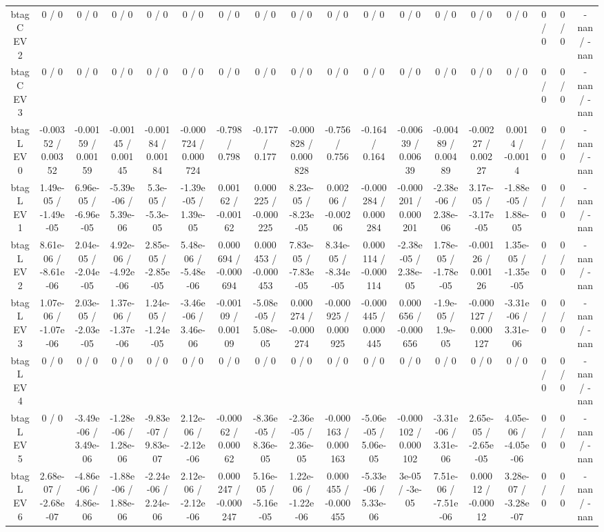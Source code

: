 \documentclass[10pt]{article}
\begin{document}
\begin{table}[htbp]
\begin{center}
\begin{tabular}{|c|c|c|c|c|c|c|c|c|c|c|c|c|c|c|c|c|c|}
  btag C EV 2 & 0 / 0 & 0 / 0 & 0 / 0 & 0 / 0 & 0 / 0 & 0 / 0 & 0 / 0 & 0 / 0 & 0 / 0 & 0 / 0 & 0 / 0 & 0 / 0 & 0 / 0 & 0 / 0 & 0 / 0 & 0 / 0 & -nan / -nan \\ 
  btag C EV 3 & 0 / 0 & 0 / 0 & 0 / 0 & 0 / 0 & 0 / 0 & 0 / 0 & 0 / 0 & 0 / 0 & 0 / 0 & 0 / 0 & 0 / 0 & 0 / 0 & 0 / 0 & 0 / 0 & 0 / 0 & 0 / 0 & -nan / -nan \\ 
  btag L EV 0 & -0.00352 / 0.00352 & -0.00159 / 0.00159 & -0.00145 / 0.00145 & -0.00184 / 0.00184 & -0.000724 / 0.000724 & -0.798 / 0.798 & -0.177 / 0.177 & -0.000828 / 0.000828 & -0.756 / 0.756 & -0.164 / 0.164 & -0.00639 / 0.00639 & -0.00489 / 0.00489 & -0.00227 / 0.00227 & 0.0014 / -0.0014 & 0 / 0 & 0 / 0 & -nan / -nan \\ 
  btag L EV 1 & 1.49e-05 / -1.49e-05 & 6.96e-05 / -6.96e-05 & -5.39e-06 / 5.39e-06 & 5.3e-05 / -5.3e-05 & -1.39e-05 / 1.39e-05 & 0.00162 / -0.00162 & 0.000225 / -0.000225 & 8.23e-05 / -8.23e-05 & 0.00206 / -0.00206 & -0.000284 / 0.000284 & -0.000201 / 0.000201 & -2.38e-06 / 2.38e-06 & 3.17e-05 / -3.17e-05 & -1.88e-05 / 1.88e-05 & 0 / 0 & 0 / 0 & -nan / -nan \\ 
  btag L EV 2 & 8.61e-06 / -8.61e-06 & 2.04e-05 / -2.04e-05 & 4.92e-06 / -4.92e-06 & 2.85e-05 / -2.85e-05 & 5.48e-06 / -5.48e-06 & 0.000694 / -0.000694 & 0.000453 / -0.000453 & 7.83e-05 / -7.83e-05 & 8.34e-05 / -8.34e-05 & 0.000114 / -0.000114 & -2.38e-05 / 2.38e-05 & 1.78e-05 / -1.78e-05 & -0.00126 / 0.00126 & 1.35e-05 / -1.35e-05 & 0 / 0 & 0 / 0 & -nan / -nan \\ 
  btag L EV 3 & 1.07e-06 / -1.07e-06 & 2.03e-05 / -2.03e-05 & 1.37e-06 / -1.37e-06 & 1.24e-05 / -1.24e-05 & -3.46e-06 / 3.46e-06 & -0.00109 / 0.00109 & -5.08e-05 / 5.08e-05 & 0.000274 / -0.000274 & -0.000925 / 0.000925 & -0.000445 / 0.000445 & 0.000656 / -0.000656 & -1.9e-05 / 1.9e-05 & -0.000127 / 0.000127 & -3.31e-06 / 3.31e-06 & 0 / 0 & 0 / 0 & -nan / -nan \\ 
  btag L EV 4 & 0 / 0 & 0 / 0 & 0 / 0 & 0 / 0 & 0 / 0 & 0 / 0 & 0 / 0 & 0 / 0 & 0 / 0 & 0 / 0 & 0 / 0 & 0 / 0 & 0 / 0 & 0 / 0 & 0 / 0 & 0 / 0 & -nan / -nan \\ 
  btag L EV 5 & 0 / 0 & -3.49e-06 / 3.49e-06 & -1.28e-06 / 1.28e-06 & -9.83e-07 / 9.83e-07 & 2.12e-06 / -2.12e-06 & -0.00062 / 0.00062 & -8.36e-05 / 8.36e-05 & -2.36e-05 / 2.36e-05 & -0.000163 / 0.000163 & -5.06e-05 / 5.06e-05 & -0.000102 / 0.000102 & -3.31e-06 / 3.31e-06 & 2.65e-05 / -2.65e-05 & 4.05e-06 / -4.05e-06 & 0 / 0 & 0 / 0 & -nan / -nan \\ 
  btag L EV 6 & 2.68e-07 / -2.68e-07 & -4.86e-06 / 4.86e-06 & -1.88e-06 / 1.88e-06 & -2.24e-06 / 2.24e-06 & 2.12e-06 / -2.12e-06 & 0.000247 / -0.000247 & 5.16e-05 / -5.16e-05 & 1.22e-06 / -1.22e-06 & 0.000455 / -0.000455 & -5.33e-06 / 5.33e-06 & 3e-05 / -3e-05 & 7.51e-06 / -7.51e-06 & 0.00012 / -0.00012 & 3.28e-07 / -3.28e-07 & 0 / 0 & 0 / 0 & -nan / -nan \\ 

\end{tabular}
\end{center}
\end{table}
\end{document}
